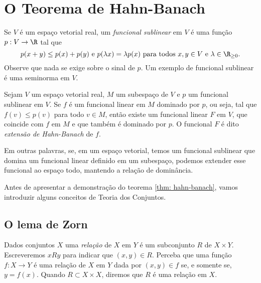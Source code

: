 \section{O Teorema de Hahn-Banach}

Se \( V \) é um espaço vetorial real, um \emph{funcional sublinear} em \( V \) é uma função \( p : V \to \R \) tal que \[
    p ( x + y ) \leq p(x) + p(y) \text{ e } p(\lambda x) = \lambda p(x) \text{ para todos \( x, y \in V \) e \( \lambda \in \R_{ \geq 0 } \)}
.\]
Observe que nada se exige sobre o sinal de \( p \).
Um exemplo de funcional sublinear é uma seminorma em \( V \).

\begin{teo}
    \label{thm: hahn-banach}
    Sejam \( V \) um espaço vetorial real, \( M \) um subespaço de \( V \) e \( p \) um funcional sublinear em \( V \).
    Se \( f \) é um funcional linear em \( M \) dominado por \( p \), ou seja, tal que \( f(v) \leq p(v) \) para todo \( v \in M \), então existe um funcional linear \( F \) em \( V \), que coincide com \( f \) em \( M \) e que também é dominado por \( p \).
    O funcional \( F \) é dito \emph{extensão de Hahn-Banach} de \( f \).
\end{teo}

Em outras palavras, se, em um espaço vetorial, temos um funcional sublinear que domina um funcional linear definido em um subespaço, podemos extender esse funcional ao espaço todo, mantendo a relação de dominância.

Antes de apresentar a demonstração do teorema \ref{thm: hahn-banach}, vamos introduzir alguns conceitos de Teoria dos Conjuntos.


\subsection{O lema de Zorn}

Dados conjuntos \( X \) uma \emph{relação} de \( X \) em \( Y \) é um subconjunto \( R \) de \( X \times Y \). 
Escreveremos \( x R y \) para indicar que \( ( x, y ) \in R \).
Perceba que uma função \( f : X \to Y \) é uma relação de \( X \) em \( Y \) dada por \( ( x, y ) \in f \) se, e somente se, \( y = f(x) \).
Quando \( R \subset X \times X \), diremos que \( R \) é uma relação em \( X \).


